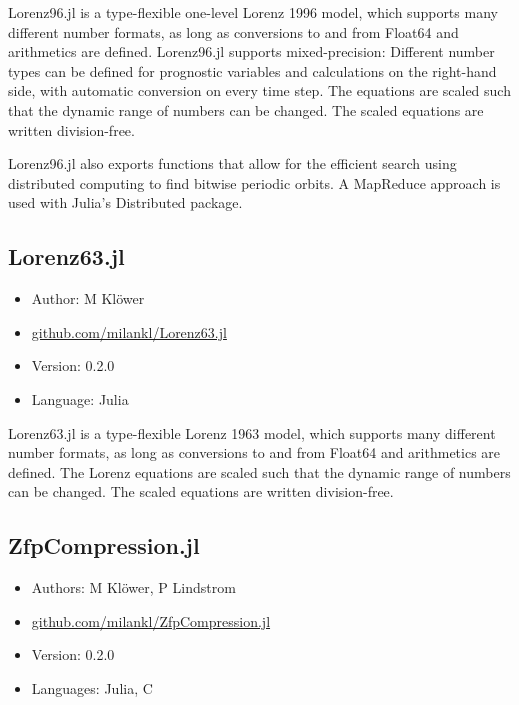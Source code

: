 Lorenz96.jl is a type-flexible one-level Lorenz 1996 model, which supports many different number formats, as long as conversions to and from Float64 and arithmetics are defined.
Lorenz96.jl supports mixed-precision: Different number types can be defined for prognostic variables and calculations on the right-hand side, with automatic conversion on every time step.
The equations are scaled such that the dynamic range of numbers can be changed. The scaled equations are written division-free.

Lorenz96.jl also exports functions that allow for the efficient search using distributed computing to find bitwise periodic orbits. A MapReduce approach is used with Julia's Distributed package.

\subsection{Lorenz63.jl}

\begin{itemize}
    \setlength\itemsep{-5pt}
    \item Author: M Klöwer
    \item \href{https://github.com/milankl/Lorenz63.jl}{github.com/milankl/Lorenz63.jl}
    \item Version: 0.2.0
    \item Language: Julia
\end{itemize}

Lorenz63.jl is a type-flexible Lorenz 1963 model, which supports many different number formats, as long as conversions to and from Float64 and arithmetics are defined.
The Lorenz equations are scaled such that the dynamic range of numbers can be changed. The scaled equations are written division-free.

\subsection{ZfpCompression.jl}

\begin{itemize}
    \setlength\itemsep{-5pt}
    \item Authors: M Klöwer, P Lindstrom
    \item \href{https://github.com/milankl/ZfpCompression.jl}{github.com/milankl/ZfpCompression.jl}
    \item Version: 0.2.0
    \item Languages: Julia, C
\end{itemize}

